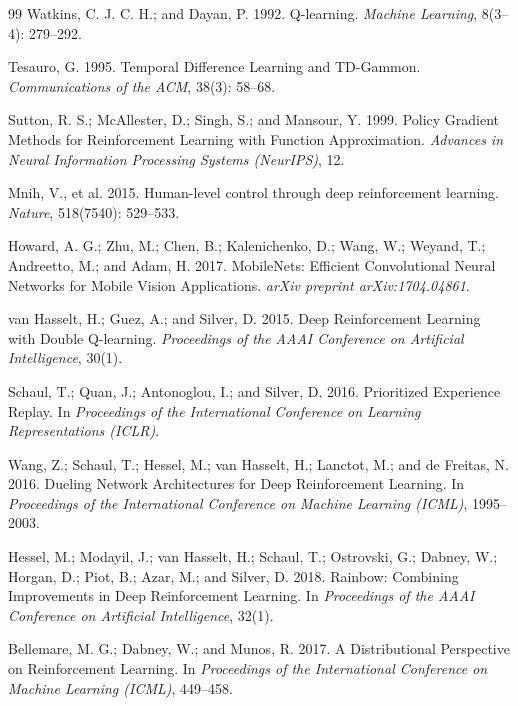 \documentclass[letterpaper]{article}
\begin{document}
\begin{thebibliography}{99}
Watkins, C. J. C. H.; and Dayan, P. 1992.
Q-learning.
\textit{Machine Learning}, 8(3--4): 279--292.

Tesauro, G. 1995.
Temporal Difference Learning and TD-Gammon.
\textit{Communications of the ACM}, 38(3): 58--68.

Sutton, R. S.; McAllester, D.; Singh, S.; and Mansour, Y. 1999.
Policy Gradient Methods for Reinforcement Learning with Function Approximation.
\textit{Advances in Neural Information Processing Systems (NeurIPS)}, 12.

Mnih, V., et al. 2015.
Human-level control through deep reinforcement learning.
\textit{Nature}, 518(7540): 529--533.

Howard, A. G.; Zhu, M.; Chen, B.; Kalenichenko, D.; Wang, W.; Weyand, T.; Andreetto, M.; and Adam, H. 2017.
MobileNets: Efficient Convolutional Neural Networks for Mobile Vision Applications.
\textit{arXiv preprint arXiv:1704.04861}.

van Hasselt, H.; Guez, A.; and Silver, D. 2015.
Deep Reinforcement Learning with Double Q-learning.
\textit{Proceedings of the AAAI Conference on Artificial Intelligence}, 30(1).

Schaul, T.; Quan, J.; Antonoglou, I.; and Silver, D. 2016.
Prioritized Experience Replay.
In \textit{Proceedings of the International Conference on Learning Representations (ICLR)}.

Wang, Z.; Schaul, T.; Hessel, M.; van Hasselt, H.; Lanctot, M.; and de Freitas, N. 2016.
Dueling Network Architectures for Deep Reinforcement Learning.
In \textit{Proceedings of the International Conference on Machine Learning (ICML)}, 1995--2003.

Hessel, M.; Modayil, J.; van Hasselt, H.; Schaul, T.; Ostrovski, G.; Dabney, W.; Horgan, D.; Piot, B.; Azar, M.; and Silver, D. 2018.
Rainbow: Combining Improvements in Deep Reinforcement Learning.
In \textit{Proceedings of the AAAI Conference on Artificial Intelligence}, 32(1).

Bellemare, M. G.; Dabney, W.; and Munos, R. 2017.
A Distributional Perspective on Reinforcement Learning.
In \textit{Proceedings of the International Conference on Machine Learning (ICML)}, 449--458.


\end{thebibliography}
\end{document}
